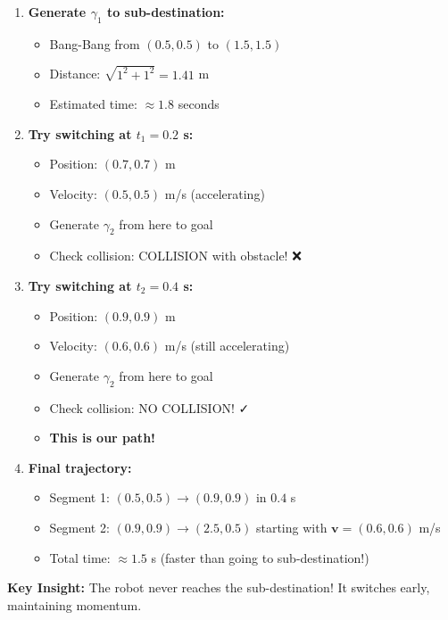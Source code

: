 \documentclass[12pt,a4paper]{article}
\begin{document}
\begin{enumerate}
    \item \textbf{Generate $\gamma_1$ to sub-destination:}
    \begin{itemize}
        \item Bang-Bang from $(0.5, 0.5)$ to $(1.5, 1.5)$
        \item Distance: $\sqrt{1^2 + 1^2} = 1.41$ m
        \item Estimated time: $\approx 1.8$ seconds
    \end{itemize}
    
    \item \textbf{Try switching at $t_1 = 0.2$ s:}
    \begin{itemize}
        \item Position: $(0.7, 0.7)$ m
        \item Velocity: $(0.5, 0.5)$ m/s (accelerating)
        \item Generate $\gamma_2$ from here to goal
        \item Check collision: COLLISION with obstacle! ❌
    \end{itemize}
    
    \item \textbf{Try switching at $t_2 = 0.4$ s:}
    \begin{itemize}
        \item Position: $(0.9, 0.9)$ m  
        \item Velocity: $(0.6, 0.6)$ m/s (still accelerating)
        \item Generate $\gamma_2$ from here to goal
        \item Check collision: NO COLLISION! ✓
        \item \textbf{This is our path!}
    \end{itemize}
    
    \item \textbf{Final trajectory:}
    \begin{itemize}
        \item Segment 1: $(0.5, 0.5) \to (0.9, 0.9)$ in $0.4$ s
        \item Segment 2: $(0.9, 0.9) \to (2.5, 0.5)$ starting with $\mathbf{v} = (0.6, 0.6)$ m/s
        \item Total time: $\approx 1.5$ s (faster than going to sub-destination!)
    \end{itemize}
\end{enumerate}

\textbf{Key Insight:} The robot never reaches the sub-destination! It switches early, maintaining momentum.
\end{document}
